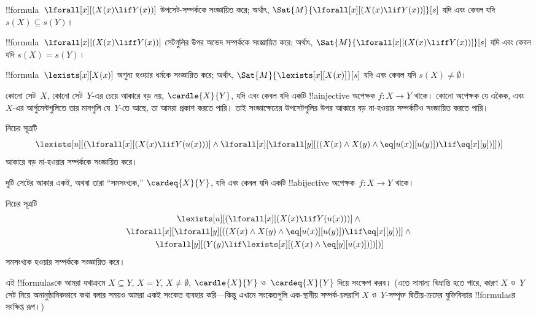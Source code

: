 \documentclass[../../../include/open-logic-section]{subfiles}
\begin{document}


\begin{prop}
!!{formula}~$\lforall[x][(X(x) \lif Y(x))]$ উপসেট-সম্পর্ককে
সংজ্ঞায়িত করে; অর্থাৎ, $\Sat{M}{\lforall[x][(X(x) \lif Y(x))]}[s]$
যদি এবং কেবল যদি $s(X) \subseteq s(Y)$।
\end{prop}

\begin{prop}
!!{formula}~$\lforall[x][(X(x) \liff Y(x))]$ সেটগুলির উপর অভেদ
সম্পর্ককে সংজ্ঞায়িত করে; অর্থাৎ,
$\Sat{M}{\lforall[x][(X(x) \liff Y(x))]}[s]$ যদি এবং কেবল যদি $s(X) =
s(Y)$।
\end{prop}

\begin{prop}
!!{formula}~$\lexists[x][X(x)]$ অশূন্য হওয়ার ধর্মকে সংজ্ঞায়িত করে;
অর্থাৎ, $\Sat{M}{\lexists[x][X(x)]}[s]$ যদি এবং কেবল যদি $s(X) \neq
\emptyset$।
\end{prop}

কোনো সেট~$X$, কোনো সেট~$Y$-এর চেয়ে আকারে বড় নয়, $\cardle{X}{Y}$,
যদি এবং কেবল যদি একটি !!a{injective} অপেক্ষক $f\colon X \to Y$ থাকে।
কোনো অপেক্ষক যে একৈক, এবং~$X$-এর আর্গুমেন্টগুলিতে তার মানগুলি যে~$Y$-তে
আছে, তা আমরা প্রকাশ করতে পারি। তাই সংজ্ঞাক্ষেত্রের উপসেটগুলির উপর আকারে
বড় না-হওয়ার সম্পর্কটিও সংজ্ঞায়িত করতে পারি।

\begin{prop}
নিচের সূত্রটি
\[
\lexists[u][(\lforall[x][(X(x) \lif Y(u(x)))] \land
  \lforall[x][\lforall[y][((X(x) \land X(y) \land
      \eq[u(x)][u(y)]) \lif \eq[x][y])]])]
\]
আকারে বড় না-হওয়ার সম্পর্ককে সংজ্ঞায়িত করে।
\end{prop}

দুটি সেটের আকার একই, অথবা তারা ``সমসংখ্যক,'' $\cardeq{X}{Y}$, যদি এবং
কেবল যদি একটি !!a{bijective} অপেক্ষক~$f\colon X \to Y$ থাকে।

\begin{prop}
নিচের সূত্রটি
\begin{multline*}
  \lexists[u][(\lforall[x][(X(x) \lif Y(u(x)))] \land {}\\
    \lforall[x][\lforall[y][((X(x) \land X(y) \land
      \eq[u(x)][u(y)]) \lif \eq[x][y])]]
  \land {} \\\lforall[y][(Y(y) \lif \lexists[x][(X(x)
      \land \eq[y][u(x)])])])]
\end{multline*}
সমসংখ্যক হওয়ার সম্পর্ককে সংজ্ঞায়িত করে।
\end{prop}

এই !!{formula}sকে আমরা যথাক্রমে $X \subseteq Y$, $X = Y$, $X \neq
\emptyset$, $\cardle{X}{Y}$ ও~$\cardeq{X}{Y}$ দিয়ে সংক্ষেপ করব। (এতে
সামান্য বিভ্রান্তি হতে পারে, কারণ $X$ ও~$Y$ সেট নিয়ে অনানুষ্ঠানিকভাবে
কথা বলার সময়ও আমরা একই সংকেত ব্যবহার করি---কিন্তু এখানে সংকেতগুলি
এক-স্থানীয় সম্পর্ক-চলরাশি $X$ ও~$Y$-সম্পৃক্ত দ্বিতীয়-ক্রমের
যুক্তিবিদ্যার !!{formula}sর সংক্ষিপ্ত রূপ।)
\end{document}
